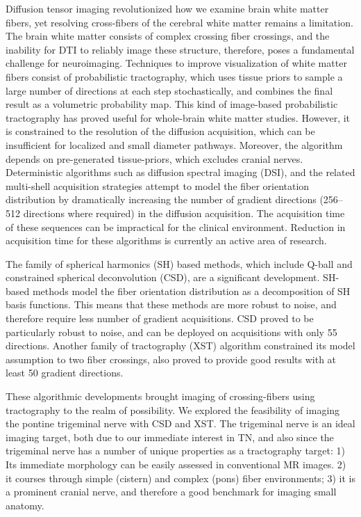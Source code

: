 Diffusion tensor imaging revolutionized how we examine brain white matter fibers, yet resolving cross-fibers of the cerebral white matter remains a limitation. The brain white matter consists of complex crossing fiber crossings, and the inability for DTI to reliably image these structure, therefore, poses a fundamental challenge for neuroimaging.
Techniques to improve visualization of white matter fibers consist of probabilistic tractography, which uses tissue priors to sample a large number of directions at each step stochastically, and combines the final result as a volumetric probability map. This kind of image-based probabilistic tractography has proved useful for whole-brain white matter studies. However, it is constrained to the resolution of the diffusion acquisition, which can be insufficient for localized and small diameter pathways. Moreover, the algorithm depends on pre-generated tissue-priors, which excludes cranial nerves. 
Deterministic algorithms such as diffusion spectral imaging (DSI), and the related multi-shell acquisition strategies attempt to model the fiber orientation distribution by dramatically increasing the number of gradient directions (256--512 directions where required) in the diffusion acquisition. The acquisition time of these sequences can be impractical for the clinical environment. Reduction in acquisition time for these algorithms is currently an active area of research.

The family of spherical harmonics (SH) based methods, which include Q-ball and constrained spherical deconvolution (CSD), are a significant development. SH-based methods model the fiber orientation distribution as a decomposition of SH basis functions. This means that these methods are more robust to noise, and therefore require less number of gradient acquisitions. CSD proved to be particularly robust to noise, and can be deployed on acquisitions with only 55 directions. Another family of tractography (XST) algorithm constrained its model assumption to two fiber crossings, also proved to provide good results with at least 50 gradient directions.

These algorithmic developments brought imaging of crossing-fibers using tractography to the realm of possibility. We explored the feasibility of imaging the pontine trigeminal nerve with CSD and XST. The trigeminal nerve is an ideal imaging target, both due to our immediate interest in TN, and also since the trigeminal nerve has a number of unique properties as a tractography target: 1) Its immediate morphology can be easily assessed in conventional MR images. 2) it courses through simple (cistern) and complex (pons) fiber environments; 3) it is a prominent cranial nerve, and therefore a good benchmark for imaging small anatomy.


